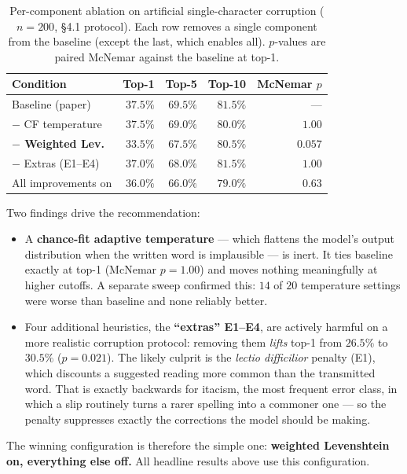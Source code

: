 \documentclass[11pt]{article}
\begin{document}
\begin{table}[h]
  \centering
  \caption{Per-component ablation on artificial single-character corruption
  ($n=200$, \S4.1 protocol). Each row removes a single component from the baseline
  (except the last, which enables all). $p$-values are paired McNemar against the
  baseline at top-1.}
  \label{tab:abl}
  \begin{tabular}{lrrrr}
    \toprule
    Condition & Top-1 & Top-5 & Top-10 & McNemar $p$ \\
    \midrule
    Baseline (paper)            & $37.5\%$ & $69.5\%$ & $81.5\%$ & --- \\
    $-$ CF temperature          & $37.5\%$ & $69.0\%$ & $80.0\%$ & $1.00$ \\
    \textbf{$-$ Weighted Lev.}  & $\mathbf{33.5\%}$ & $67.5\%$ & $80.5\%$ & $\mathbf{0.057}$ \\
    $-$ Extras (E1--E4)         & $37.0\%$ & $68.0\%$ & $81.5\%$ & $1.00$ \\
    All improvements on         & $36.0\%$ & $66.0\%$ & $79.0\%$ & $0.63$ \\
    \bottomrule
  \end{tabular}
\end{table}

Two findings drive the recommendation:

\begin{itemize}
  \item A \textbf{chance-fit adaptive temperature} --- which flattens the model's
  output distribution when the written word is implausible --- is inert. It ties
  baseline exactly at top-1 (McNemar $p=1.00$) and moves nothing meaningfully
  at higher cutoffs. A separate sweep confirmed this: $14$ of $20$ temperature
  settings were worse than baseline and none reliably better.
  \item Four additional heuristics, the \textbf{``extras'' E1--E4}, are actively
  harmful on a more realistic corruption protocol: removing them \emph{lifts}
  top-1 from $26.5\%$ to $30.5\%$ ($p=0.021$). The likely culprit is the
  \emph{lectio difficilior} penalty (E1), which discounts a suggested reading
  more common than the transmitted word. That is exactly backwards for itacism,
  the most frequent error class, in which a slip routinely turns a rarer spelling
  into a commoner one --- so the penalty suppresses exactly the corrections the
  model should be making.
\end{itemize}

The winning configuration is therefore the simple one: \textbf{weighted Levenshtein
on, everything else off.} All headline results above use this configuration.
\end{document}
